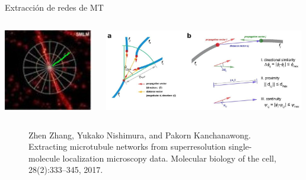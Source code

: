 \documentclass[]{beamer}
\begin{document}
\begin{frame}{Extracci\'on de redes de MT}
    
    \begin{columns}
    \hspace{-1cm}
        \begin{column}{0.25\textwidth}
            \centering
            \includegraphics[height=1.4in]{Pictures/MT-LFT.jpeg}
        \end{column}
        \begin{column}{0.75\textwidth}
            \centering
            \includegraphics[height=1.4in]{Pictures/MT-OFT.jpeg}
        \end{column}
    \end{columns}
    \begin{figure}
        \caption{Zhen Zhang, Yukako Nishimura, and Pakorn Kanchanawong. Extracting microtubule networks from superresolution single-molecule localization microscopy data. Molecular biology of the cell, 28(2):333–345, 2017.}
    \end{figure}
\end{frame}
\end{document}
